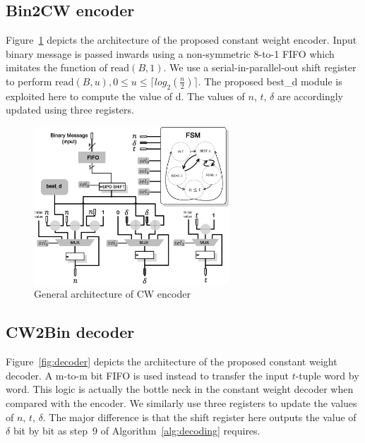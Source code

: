 \documentclass[10pt,journal,compsoc]{IEEEtran}
\begin{document}
\subsection{Bin2CW encoder}
Figure~\ref{fig:encoder} depicts the architecture of the proposed constant weight encoder.
Input binary message is passed inwards using a non-symmetric 8-to-1 FIFO which imitates the function of $\text{read}(B,1)$.
We use a serial-in-parallel-out shift register to perform $\text{read}(B,u), 0 \leq u\leq \lceil log_2(\frac{n}{2})\rceil$.
The proposed best\_d module is exploited here to compute the value of d. The values of $n$, $t$, $\delta$
are accordingly updated using three registers.

\begin{figure}[!tbh]\centering
      \includegraphics[width=0.65\textwidth]{./fig/encoder.eps}
  \caption{General architecture of CW encoder}\label{fig:encoder}
\end{figure}

\subsection{CW2Bin decoder}
Figure~\ref{fig:decoder} depicts the architecture of the proposed constant weight decoder.
A m-to-m bit FIFO is used instead to transfer the input $t$-tuple word by word. This logic
is actually the bottle neck in the constant weight decoder when compared with the encoder. We similarly use
three registers to update the values of $n$, $t$, $\delta$. The major difference is that the shift register
here outputs the value of $\delta$ bit by bit as step~9 of Algorithm~\ref{alg:decoding} requires.
\end{document}
